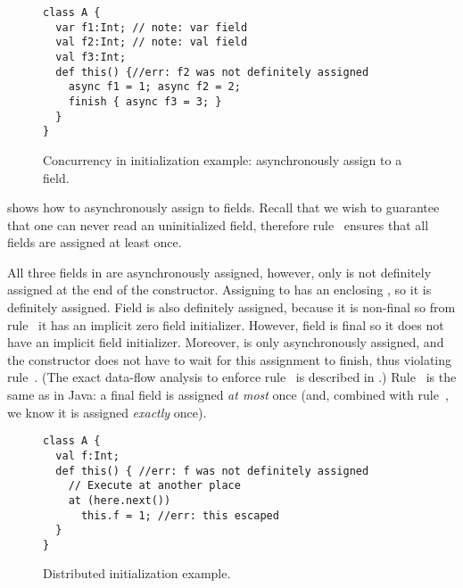 \begin{figure}
\vspace{-0.2cm}\begin{lstlisting}
class A {
  var f1:Int; // note: var field
  val f2:Int; // note: val field
  val f3:Int;
  def this() {//err: f2 was not definitely assigned
    async f1 = 1; async f2 = 2;
    finish { async f3 = 3; }
  }
}
\end{lstlisting}\vspace{-0.2cm}
\caption{Concurrency in initialization example: asynchronously assign to a field.
    }
\label{Figure:Asynchronously-init}
\end{figure}


 shows how to asynchronously assign to fields.
Recall that we wish to guarantee that one can never read an uninitialized field,
    therefore rule~ ensures that all fields are assigned at least once.

All three fields in  are asynchronously assigned,
    however, only  is not definitely assigned at the end of the constructor.
Assigning to  has an enclosing , so
    it is definitely assigned.
Field  is also definitely assigned, because it is non-final
    so from rule~ it has an implicit zero field initializer.
However, field  is final so it does not have an implicit field initializer.
Moreover,  is only asynchronously assigned,
    and the constructor does not have to wait for this assignment to finish,
    thus violating rule~.
(The exact data-flow analysis to enforce rule~ is described in
    .)
Rule~ is the same as in Java: a final field is assigned \emph{at most} once
    (and, combined with rule~, we know it is assigned \emph{exactly} once).



\begin{figure}
\vspace{-0.2cm}\begin{lstlisting}
class A {
  val f:Int;
  def this() { //err: f was not definitely assigned
    // Execute at another place
    at (here.next())
      this.f = 1; //err: this escaped
  }
}
\end{lstlisting}\vspace{-0.2cm}
\caption{Distributed initialization example. %
    }
\label{Figure:Multi-place}
\end{figure}

